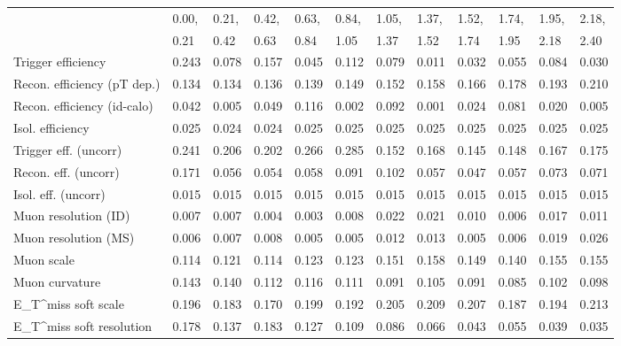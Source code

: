 \begin{tabular}{l|p{0.6cm}p{0.6cm}p{0.6cm}p{0.6cm}p{0.6cm}p{0.6cm}p{0.6cm}p{0.6cm}p{0.6cm}p{0.6cm}p{0.6cm}}
\hline
   & 0.00, & 0.21, & 0.42, & 0.63, & 0.84, & 1.05, & 1.37, & 1.52, & 1.74, & 1.95, & 2.18,  \\ 
   & 0.21 & 0.42 & 0.63 & 0.84 & 1.05 & 1.37 & 1.52 & 1.74 & 1.95 & 2.18 & 2.40  \\ 
\hline
Trigger efficiency                       & 0.243 & 0.078 & 0.157 & 0.045 & 0.112 & 0.079 & 0.011 & 0.032 & 0.055 & 0.084 & 0.030 \\
Recon. efficiency (pT dep.)              & 0.134 & 0.134 & 0.136 & 0.139 & 0.149 & 0.152 & 0.158 & 0.166 & 0.178 & 0.193 & 0.210 \\
Recon. efficiency (id-calo)              & 0.042 & 0.005 & 0.049 & 0.116 & 0.002 & 0.092 & 0.001 & 0.024 & 0.081 & 0.020 & 0.005 \\
Isol. efficiency                         & 0.025 & 0.024 & 0.024 & 0.025 & 0.025 & 0.025 & 0.025 & 0.025 & 0.025 & 0.025 & 0.025 \\
Trigger eff. (uncorr)                    & 0.241 & 0.206 & 0.202 & 0.266 & 0.285 & 0.152 & 0.168 & 0.145 & 0.148 & 0.167 & 0.175 \\
Recon. eff. (uncorr)                     & 0.171 & 0.056 & 0.054 & 0.058 & 0.091 & 0.102 & 0.057 & 0.047 & 0.057 & 0.073 & 0.071 \\
Isol. eff. (uncorr)                      & 0.015 & 0.015 & 0.015 & 0.015 & 0.015 & 0.015 & 0.015 & 0.015 & 0.015 & 0.015 & 0.015 \\
Muon resolution (ID)                     & 0.007 & 0.007 & 0.004 & 0.003 & 0.008 & 0.022 & 0.021 & 0.010 & 0.006 & 0.017 & 0.011 \\
Muon resolution (MS)                     & 0.006 & 0.007 & 0.008 & 0.005 & 0.005 & 0.012 & 0.013 & 0.005 & 0.006 & 0.019 & 0.026 \\
Muon scale                               & 0.114 & 0.121 & 0.114 & 0.123 & 0.123 & 0.151 & 0.158 & 0.149 & 0.140 & 0.155 & 0.155 \\
Muon curvature                           & 0.143 & 0.140 & 0.112 & 0.116 & 0.111 & 0.091 & 0.105 & 0.091 & 0.085 & 0.102 & 0.098 \\
E_{T}^{miss} soft scale                  & 0.196 & 0.183 & 0.170 & 0.199 & 0.192 & 0.205 & 0.209 & 0.207 & 0.187 & 0.194 & 0.213 \\
E_{T}^{miss} soft resolution             & 0.178 & 0.137 & 0.183 & 0.127 & 0.109 & 0.086 & 0.066 & 0.043 & 0.055 & 0.039 & 0.035 \\

\end{tabular}
